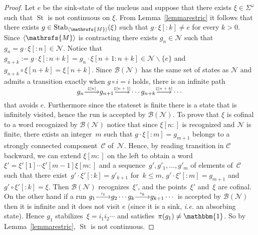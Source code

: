\documentclass{amsart}
\begin{document}
\begin{proof}
Let $e$ be the sink-state of the nucleus and suppose that there exists
$\xi \in {{{\Sigma}}}^{\omega}$ such that $\operatorname{St}$ is not continuous on
  \(\xi\). From Lemma~\ref{lemmarestric} it follows that there
exists $g \in\operatorname{Stab}_{{{\langle}{{\mathrsfs{{{M}}}}}{\rangle}}}(\xi)$ such that $g{{{\cdot}}}\xi[:k] \neq e$ for every $k
> 0$. Since ${{{\langle}{{\mathrsfs{{{M}}}}}{\rangle}}}$ is contracting there exists $g_n \in \mathcal{N}$ such
that $g_n=g{{{\cdot}}} \xi[:n] \in \mathcal{N}$. Notice that
$g_{n+k}:=g{{{\cdot}}}\xi[:n+k] = g_n{{{\cdot}}} \xi[n+1:n+k] \in
\mathcal{N}\smallsetminus\{e\}$ and $g_{n+k}{{{\circ}}}
\xi[n+k] = \xi[n+k]$. Since ${\mathcal{B}({\mathcal{N}})}$ has the same set of states as
$\mathcal{N}$ and admits a transition exactly when $g{{{\circ}}} i = i$ holds, there is an infinite path
$$
g_n{\smash{\stackrel{\text{\tiny{${\xi[n]}$}}}{\relbar\joinrel\longrightarrow}}} g_{n+1}{\smash{\stackrel{\text{\tiny{${\xi[n+1]}$}}}{\relbar\joinrel\longrightarrow}}}\cdots g_{n+k}{\smash{\stackrel{\text{\tiny{${\xi[n+k]}$}}}{\relbar\joinrel\longrightarrow}}}\cdots
$$
that avoids $e$. Furthermore since the stateset is finite there is a state that is infinitely visited, hence the run is accepted by ${\mathcal{B}({\mathcal{N}})}$. To prove that $\xi$ is cofinal to a word recognized by ${\mathcal{B}({\mathcal{N}})}$ notice that since $\xi[n:]$ is recognized and $\mathcal{N}$ is finite, there exists an integer~$m$ such that $g{{{\cdot}}}\xi[:m]=g_{m+1}$ belongs to a strongly connected component~$\mathcal{C}$ of~$\mathcal{N}$. Hence, by reading transition in $\mathcal{C}$ backward,  we can extend $\xi[m:]$ on the left to obtain a word $\xi'=\xi'[1]\cdots \xi'[m-1]\xi[m:]$ and a sequence~$g', g'_1, \ldots, g'_{m}$ of elements of~$\mathcal{C}$   such that there exist~$g'{{{\cdot}}} \xi'[: k]  = g'_{k+1}$ for~$k \leq m $, $g'{{{\cdot}}} \xi'[: m] = g_{m+1} $ and  $g'{{{\circ}}} \xi'[: k] = \xi  $. Then ${\mathcal{B}({\mathcal{N}})}$ recognizes~$\xi'$, and the points~$\xi'$ and~$\xi$ are cofinal.\\
On the other hand if a run $g_1{\smash{\stackrel{\text{\tiny{${i_1}$}}}{\relbar\joinrel\longrightarrow}}} g_{2}\cdots g_k {\smash{\stackrel{\text{\tiny{${i_k}$}}}{\relbar\joinrel\longrightarrow}}} g_{k+1}\cdots$ is accepted by ${\mathcal{B}({\mathcal{N}})}$ then it is infinite and it does not visit $e$ (since it is a sink, \emph{i.e.} an absorbing state). Hence $g_1$ stabilizes~$\xi = i_1i_2 \cdots$ and satisfies~$\pi(g_1) \neq \operatorname{\mathbbm{1}}$. So by Lemma~\ref{lemmarestric}, $\operatorname{St}$ is not continuous.\end{proof}
\end{document}
